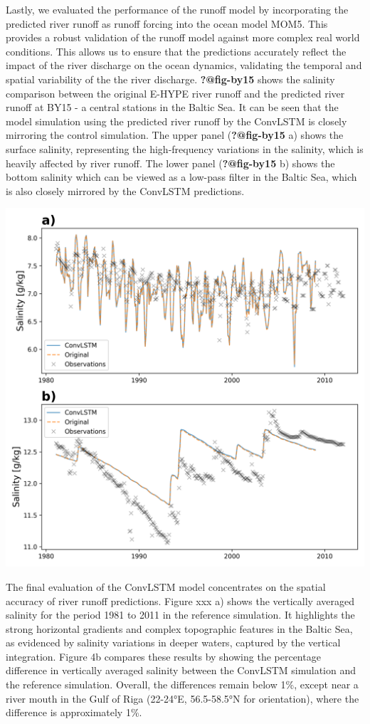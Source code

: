 \documentclass[
]{agujournal2019}
\begin{document}
Lastly, we evaluated the performance of the runoff model by
incorporating the predicted river runoff as runoff forcing into the
ocean model MOM5. This provides a robust validation of the runoff model
against more complex real world conditions. This allows us to ensure
that the predictions accurately reflect the impact of the river
discharge on the ocean dynamics, validating the temporal and spatial
variability of the the river discharge. \textbf{?@fig-by15} shows the
salinity comparison between the original E-HYPE river runoff and the
predicted river runoff at BY15 - a central stations in the Baltic Sea.
It can be seen that the model simulation using the predicted river
runoff by the ConvLSTM is closely mirroring the control simulation. The
upper panel (\textbf{?@fig-by15} a) shows the surface salinity,
representing the high-frequency variations in the salinity, which is
heavily affected by river runoff. The lower panel (\textbf{?@fig-by15}
b) shows the bottom salinity which can be viewed as a low-pass filter in
the Baltic Sea, which is also closely mirrored by the ConvLSTM
predictions.

\includegraphics{../src/figures/by15_model.png}

The final evaluation of the ConvLSTM model concentrates on the spatial
accuracy of river runoff predictions. Figure xxx a) shows the vertically
averaged salinity for the period 1981 to 2011 in the reference
simulation. It highlights the strong horizontal gradients and complex
topographic features in the Baltic Sea, as evidenced by salinity
variations in deeper waters, captured by the vertical integration.
Figure 4b compares these results by showing the percentage difference in
vertically averaged salinity between the ConvLSTM simulation and the
reference simulation. Overall, the differences remain below 1\%, except
near a river mouth in the Gulf of Riga (22-24°E, 56.5-58.5°N for
orientation), where the difference is approximately 1\%.
\end{document}
